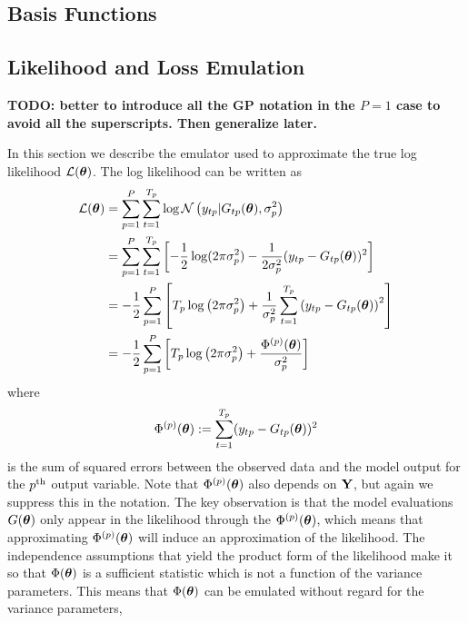 \documentclass[12pt]{article}
\begin{document}
\subsection{Basis Functions}

\subsection{Likelihood and Loss Emulation}
\textbf{TODO: better to introduce all the GP notation in the $P = 1$ case to avoid all the superscripts. Then generalize later.}

In this section we describe the emulator used to approximate the true log likelihood $\mathcal{L}(\boldsymbol{\theta})$. The log likelihood can be written as 
\begin{align*}
\mathcal{L}(\boldsymbol{\theta}) &= \sum_{p = 1}^{P} \sum_{t = 1}^{T_{p}} \log \mathcal{N}\left(y_{t p}| G_{t p}(\boldsymbol{\theta}), \sigma_{p}^2 \right) \\
	         &= \sum_{p = 1}^{P}  \sum_{t = 1}^{T_{p}} \left[-\frac{1}{2} \log(2\pi \sigma_{p}^2) - \frac{1}{2\sigma_{p}^2} (y_{t p} - G_{t p}(\boldsymbol{\theta}))^2\right]  \\
	         &= -\frac{1}{2} \sum_{p = 1}^{P} \left[T_{p} \log\left(2\pi \sigma_{p}^2 \right) + \frac{1}{\sigma_{p}^2}\sum_{t = 1}^{T_{p}} \left(y_{t p} - 
	                G_{t p}(\boldsymbol{\theta})\right)^2  \right] \\
	         &= -\frac{1}{2} \sum_{p = 1}^{P} \left[T_{p} \log\left(2\pi \sigma_{p}^2 \right) + \frac{\Phi^{(p)}(\boldsymbol{\theta})}{\sigma_{p}^2} \right] 
\end{align*}
where 
\[\Phi^{(p)}(\boldsymbol{\theta}) := \sum_{t = 1}^{T_{p}} (y_{t p} - G_{t p}(\boldsymbol{\theta}))^2\]
is the sum of squared errors between the observed data and the model output for the $p^{\text{th}}$ output variable. Note that $\Phi^{(p)}(\boldsymbol{\theta})$ also depends on $\mathbf{Y}$, but again we suppress this in the notation. The key observation 
is that the model evaluations $G(\boldsymbol{\theta})$ only appear in the likelihood through the $\Phi^{(p)}(\boldsymbol{\theta})$, which means that approximating $\Phi^{(p)}(\boldsymbol{\theta})$ will induce an approximation of the likelihood. The independence assumptions 
that yield the product form of the likelihood make it so that $\Phi(\boldsymbol{\theta})$ is a sufficient statistic which is not a function of the variance parameters. This means that $\Phi(\boldsymbol{\theta})$ can be emulated without regard for the variance parameters, 
\end{document}
